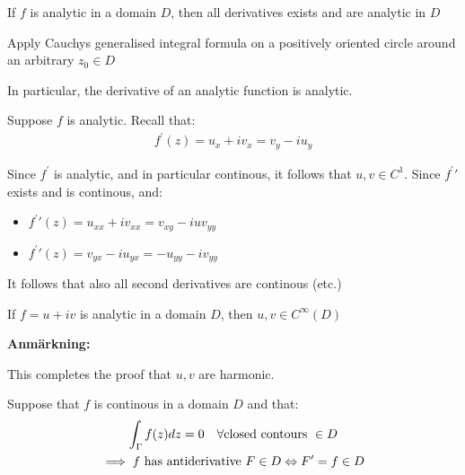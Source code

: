\par\bigskip
\begin{theo}[]{}
  If $f$ is analytic in a domain $D$, then all derivatives exists and are analytic in $D$
\end{theo}
\par\bigskip
\begin{prf}[]{}
  Apply Cauchys generalised integral formula on a positively oriented circle around an arbitrary $z_0\in D$
\end{prf}
\par\bigskip
\noindent In particular, the derivative of an analytic function is analytic.
\par\bigskip
\noindent Suppose $f$ is analytic. Recall that:
\begin{equation*}
  \begin{gathered}
    f^{\prime}(z) = u_x+iv_x = v_y-iu_y
  \end{gathered}
\end{equation*}
\par\bigskip
\noindent Since $f^{\prime}$ is analytic, and in particular continous, it follows that $u,v\in C^1$. Since $f^{\prime}\prime$ exists and is continous, and:\par
\begin{itemize}
  \item $f^{\prime}\prime(z) = u_{xx}+iv_{xx} = v_{xy}-iuv_{yy}$
  \item $f^{\prime}\prime(z) = v_{yx}-iu_{yx} = -u_{yy}-iv_{yy}$
\end{itemize}
\par\bigskip
\noindent It follows that also all second derivatives are continous (etc.)
\par\bigskip
\begin{theo}[]{}
  If $f = u+iv$ is analytic in a domain $D$, then $u,v\in C^{\infty}(D)$
\end{theo}
\par\bigskip
\noindent\textbf{Anmärkning:}\par
\noindent This completes the proof that $u,v$  are harmonic.
\par\bigskip
Suppose that $f$ is continous in a domain $D$ and that:
\begin{equation*}
 \begin{gathered}
   \int_{\Gamma}f(z)dz = 0\quad\forall \text{closed contours } \in D\\
   \implies f\text{ has antiderivative } F\in D\Leftrightarrow F^{\prime} = f\in D
 \end{gathered}
\end{equation*}
